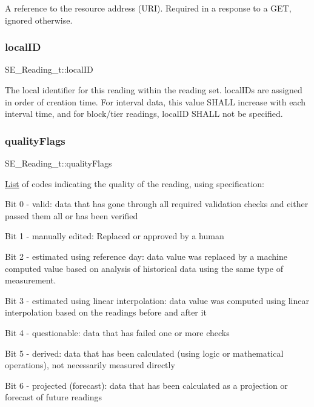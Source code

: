 A reference to the resource address (U\+RI). Required in a response to a G\+ET, ignored otherwise. \mbox{\label{group__Reading_ga5242942e56b0d190231a18aa848f5912}} 
\subsubsection{\texorpdfstring{local\+ID}{localID}}
{\footnotesize\ttfamily S\+E\+\_\+\+Reading\+\_\+t\+::local\+ID}

The local identifier for this reading within the reading set. local\+I\+Ds are assigned in order of creation time. For interval data, this value S\+H\+A\+LL increase with each interval time, and for block/tier readings, local\+ID S\+H\+A\+LL not be specified. \mbox{\label{group__Reading_ga4ba92621db8e5121414fbf926f56c57b}} 
\subsubsection{\texorpdfstring{quality\+Flags}{qualityFlags}}
{\footnotesize\ttfamily S\+E\+\_\+\+Reading\+\_\+t\+::quality\+Flags}

\hyperlink{structList}{List} of codes indicating the quality of the reading, using specification\+:

Bit 0 -\/ valid\+: data that has gone through all required validation checks and either passed them all or has been verified

Bit 1 -\/ manually edited\+: Replaced or approved by a human

Bit 2 -\/ estimated using reference day\+: data value was replaced by a machine computed value based on analysis of historical data using the same type of measurement.

Bit 3 -\/ estimated using linear interpolation\+: data value was computed using linear interpolation based on the readings before and after it

Bit 4 -\/ questionable\+: data that has failed one or more checks

Bit 5 -\/ derived\+: data that has been calculated (using logic or mathematical operations), not necessarily measured directly

Bit 6 -\/ projected (forecast)\+: data that has been calculated as a projection or forecast of future readings \mbox{\label{group__Reading_ga2b7915c8c3cbef1287a66b4b501dad3c}} 
